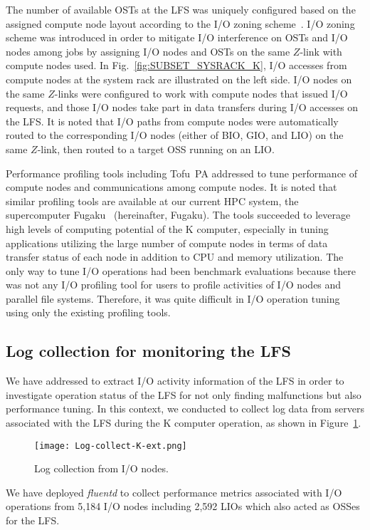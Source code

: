 \documentclass{jhps}
\begin{document}
The number of available OSTs at the LFS was uniquely configured
based on the assigned compute node layout according to
the I/O zoning scheme~\cite{sumimoto:LUG2011}.
I/O zoning scheme was introduced in order to mitigate I/O interference on OSTs
and I/O nodes among jobs by assigning I/O nodes and OSTs on the same $Z$-link
with compute nodes used.
In Fig.~\ref{fig:SUBSET_SYSRACK_K}, I/O accesses from compute nodes
at the system rack are illustrated on the left side.
I/O nodes on the same $Z$-links were configured to work with compute nodes
that issued I/O requests, and those I/O nodes
take part in data transfers during I/O accesses on the LFS.
It is noted that I/O paths from compute nodes were automatically routed
to the corresponding I/O nodes (either of BIO, GIO, and LIO) on the same $Z$-link,
then routed to a target OSS running on an LIO.

Performance profiling tools including Tofu~PA addressed to tune performance of
compute nodes and communications among compute nodes.
It is noted that similar profiling tools are available at
our current HPC system, the supercomputer Fugaku~\cite{fugaku_info:web}
(hereinafter, Fugaku).
The tools succeeded to leverage high levels of computing potential of the K computer,
especially in tuning applications utilizing the large number of compute nodes
in terms of data transfer status of each node in addition to CPU and memory utilization.
The only way to tune I/O operations had been benchmark evaluations
because there was not any I/O profiling tool for users to profile activities
of I/O nodes and parallel file systems.
Therefore, it was quite difficult in I/O operation tuning
using only the existing profiling tools.

\subsection{Log collection for monitoring the LFS}
\label{ssec:LOG_COLL_MON}

We have addressed to extract I/O activity information of the LFS
in order to investigate operation status of the LFS
for not only finding malfunctions but also performance tuning.
In this context, we conducted to collect log data from servers
associated with the LFS during the K computer operation,
as shown in Figure~\ref{fig:Log-collect-K}.
%
\begin{figure}[tb]
\centering
\texttt{[image: Log-collect-K-ext.png]}
\caption{Log collection from I/O nodes.}
\label{fig:Log-collect-K}
\end{figure}
We have deployed {\itshape fluentd} to collect performance metrics associated with
I/O operations from 5,184 I/O nodes including 2,592 LIOs which also acted as OSSes
for the LFS.
\end{document}
